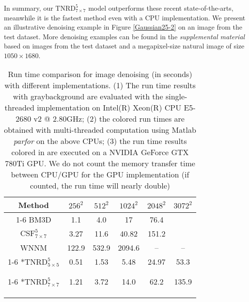 \documentclass[10pt,journal,compsoc]{IEEEtran}
\begin{document}
In summary, our $\text{TNRD}^5_{7\times 7}$ model outperforms these recent state-of-the-arts, 
meanwhile it is the fastest method even with a CPU implementation. 
We present an illustrative denoising example in Figure \ref{Gaussian25-2} on an image from the test dataset. 
More denoising examples can be found in the \textit{supplemental material} based on images from the test dataset 
and a megapixel-size natural image of size $1050 \times 1680$. 
\begin{table}[t!]
\centering
\hspace*{-0.2cm} \begin{tabular}{c c c c c c}
\Xhline{0.5pt}
\cline{1-6}
Method & $256^2$ & $512^2$ & $1024^2$ & $2048^2$ & $3072^2$\\
\cline{1-6}
\rowcolor[gray]{0.85} BM3D \cite{BM3D} &1.1 &4.0 &17 & 76.4 & {\color{black}{176.0}}\\
\rowcolor[gray]{0.85} $\text{CSF}_{7 \times 7}^5$ \cite{CSF2014} &3.27 &11.6 &40.82 & 151.2 & {\color{black}{494.8}}\\
\rowcolor[gray]{0.85} WNNM \cite{WNNM} &122.9 & 532.9 &2094.6 & -- & --\\
\cline{1-6}
\multirow{3}*{$\text{TNRD}^5_{5 \times 5}$} & \cellcolor[gray]{0.85} 0.51 & 
\cellcolor[gray]{0.85} 1.53 & \cellcolor[gray]{0.85} 5.48 
&\cellcolor[gray]{0.85} 24.97 & \cellcolor[gray]{0.85} 53.3\\
& {\color{blue}{0.43}}& {\color{blue}{0.78}}& {\color{blue}{2.25}}& {\color{blue}{8.01}}& {\color{blue}{21.6}}\\
& {\color{red}{0.005}} & {\color{red}{0.015}} & {\color{red}{0.054}} &{\color{red}{0.18}} & {\color{red}{0.39}}\\
\cline{1-6}
\multirow{3}*{$\text{TNRD}^5_{7 \times 7}$} & \cellcolor[gray]{0.85} 1.21 & 
\cellcolor[gray]{0.85} 3.72 & \cellcolor[gray]{0.85} 14.0 
&\cellcolor[gray]{0.85} 62.2& \cellcolor[gray]{0.85} 135.9\\
& {\color{blue}{0.56}}& {\color{blue}{1.17}}& {\color{blue}{3.64}}& {\color{blue}{13.01}}& {\color{blue}{30.1}}\\
& {\color{red}{0.01}} & {\color{red}{0.032}} &{\color{red}{0.116}} & {\color{red}{0.40}} & {\color{red}{0.87}}\\
\Xhline{0.5pt}
\cline{1-6}
\end{tabular}
\vspace*{0.2cm}
\caption{Run time comparison for image denoising (in seconds) with different implementations. 
(1) The run time results with \colorbox{grayB}{gray}background are evaluated 
with the single-threaded implementation on Intel(R) Xeon(R) CPU E5-2680 v2 @ 2.80GHz; 
(2) the {\color{blue}{blue}} colored run times are obtained with multi-threaded computation using Matlab \textit{parfor} 
on the above CPUs;
(3) the run time results colored in {\color{red}{red}} are executed on a NVIDIA GeForce GTX 780Ti GPU. 
We do not count the memory transfer time between CPU/GPU for the GPU implementation (if counted, the run time will nearly 
double)}\label{run time}
\vspace*{-1cm}\end{table}
\end{document}
